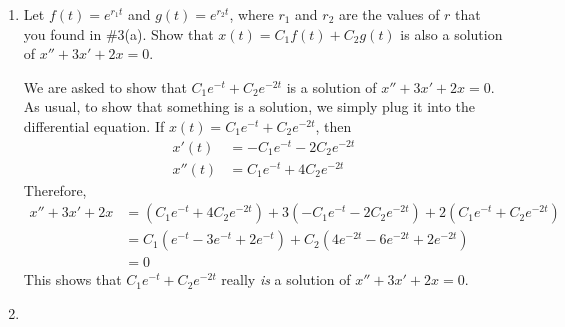 \documentclass[main]{subfiles}
\begin{document}
\begin{enumerate}
\begin{enumerate}
    \begin{solution}
    Our strategy is simply to plug $x(t) = e^{rt}$ into the differential
    equation and then to try to solve for $r$.  Let's differentiate:
    \begin{align*}
    x &= e^{rt} \\
    x' &= r e^{rt} \\
    x'' &= r^2 e^{rt}
    \end{align*}
    So, the differential equation $x'' + 3x' + 2x = 0$ becomes $r^2
    e^{rt} + 3 r e^{rt} + 2 e^{rt} = 0$, or $(r^2 + 3r + 2) e^{rt} =
    0$.  Since $e^{rt}$ can never be 0 ($e$ raised to any power is
    positive), it must be the case that $r^2 + 3r + 2 = 0$.  This
    equation is called the \uline{characteristic equation} of the
    differential equation.

    We can factor the characteristic equation as $(r + 1) (r + 2) = 0$,
    so $r = -1$ or $r = -2$.  Therefore, the solutions of the form $x(t)
    = e^{rt}$ are .
    \end{solution}

    \item
    \begin{problem}[4in]
    Let $f(t)=e^{r_1 t}$ and $g(t)=e^{r_2 t}$, where $r_1$ and $r_2$ are the values of $r$ that you found in
    {{\#3}(a)}.  Show that $x(t)= C_1
    f(t) + C_2 g(t)$ is also a solution of $x'' + 3x' + 2x = 0$. 
    \end{problem}

    \begin{solution}
    We are asked to show that $C_1 e^{-t} + C_2 e^{-2t}$ is a solution
    of $x'' + 3x' + 2x = 0$.  As usual, to show that something is a
    solution, we simply plug it into the differential equation.  If
    $x(t) = C_1 e^{-t} + C_2 e^{-2t}$, then
    \begin{align*}
    x'(t) &= - C_1 e^{-t} - 2 C_2 e^{-2t} \\
    x''(t) &= C_1 e^{-t} + 4 C_2 e^{-2t}
    \end{align*}
    Therefore,
    \begin{align*}
    x'' + 3x' + 2x &= (C_1 e^{-t} + 4 C_2 e^{-2t}) + 3 (- C_1 e^{-t} -
    2 C_2 e^{-2t}) + 2 (C_1 e^{-t} + C_2 e^{-2t}) \\
    &= C_1 (e^{-t} - 3 e^{-t} + 2 e^{-t}) + C_2 (4 e^{-2t} - 6 e^{-2t}
    + 2 e^{-2t}) \\
    &= 0
    \end{align*}
    This shows that $C_1 e^{-t} + C_2 e^{-2t}$ really \textit{is} a
    solution of $x'' + 3x' + 2x = 0$. 
    \end{solution}
\pspace{\newpage}
    \item
    

\end{enumerate}
\end{enumerate}
\end{document}
